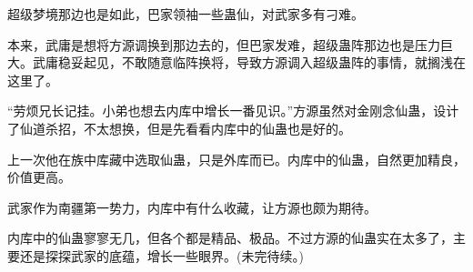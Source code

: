 \begin{this_body}
超级梦境那边也是如此，巴家领袖一些蛊仙，对武家多有刁难。

本来，武庸是想将方源调换到那边去的，但巴家发难，超级蛊阵那边也是压力巨大。武庸稳妥起见，不敢随意临阵换将，导致方源调入超级蛊阵的事情，就搁浅在这里了。

“劳烦兄长记挂。小弟也想去内库中增长一番见识。”方源虽然对金刚念仙蛊，设计了仙道杀招，不太想换，但是先看看内库中的仙蛊也是好的。

上一次他在族中库藏中选取仙蛊，只是外库而已。内库中的仙蛊，自然更加精良，价值更高。

武家作为南疆第一势力，内库中有什么收藏，让方源也颇为期待。

内库中的仙蛊寥寥无几，但各个都是精品、极品。不过方源的仙蛊实在太多了，主要还是探探武家的底蕴，增长一些眼界。(未完待续。)

\end{this_body}

